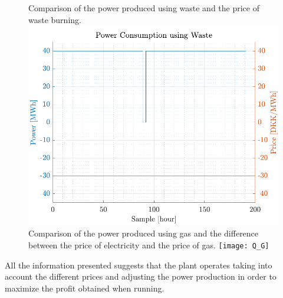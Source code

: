 \begin{figure}[H]
    \captionbox
    {       
        Comparison of the power produced using waste and the price of waste burning.          
        \label{fig:Q_W}                                  
    }                                                                 
    {                                                                  
        \includegraphics[height=.37\textwidth]{figures/Q_W} 
    }                                                                    
    \hspace{5pt}                                                          
    \captionbox  
    {          
        Comparison of the power produced using gas and the difference between the price of electricity and the price of gas.
        \label{fig:Q_G}                                     
    }                                                                     
    {                                                                     
        \texttt{[image: Q\_G]}            
    }      
\end{figure}
All the information presented suggests that the plant operates taking into account the different prices and adjusting the power production in order to maximize the profit obtained when running.

